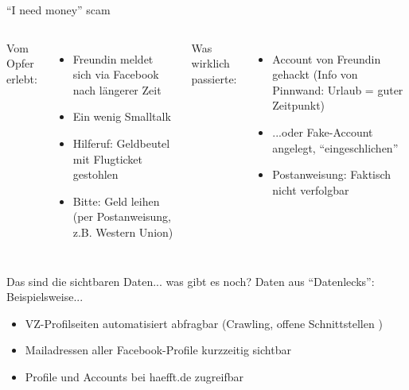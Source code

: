 \begin{frame}{"`I need money"' scam}
	\begin{columns}[t]
		Vom Opfer erlebt:
		\begin{itemize}
			\item Freundin meldet sich via Facebook nach längerer Zeit
			\item Ein wenig Smalltalk
			\item<2-> Hilferuf: Geldbeutel mit Flugticket gestohlen
			\item<2-> Bitte: Geld leihen (per Postanweisung, z.B. Western Union)
		\end{itemize}
		Was wirklich passierte:
		\begin{itemize}
			\item<3-> Account von Freundin gehackt (Info von Pinnwand: Urlaub = guter Zeitpunkt)
			\item<3-> ...oder Fake-Account angelegt, "`eingeschlichen"'
			\item<3-> Postanweisung: Faktisch nicht verfolgbar
		\end{itemize}
	\end{columns}
\end{frame}

\begin{frame}{Das sind die sichtbaren Daten... was gibt es noch?}
	Daten aus "`Datenlecks"': Beispielsweise...
	\begin{itemize}
		\item VZ-Profilseiten automatisiert abfragbar (Crawling, offene Schnittstellen%
		)
		\item Mailadressen aller Facebook-Profile kurzzeitig sichtbar%
		\item Profile und Accounts bei haefft.de zugreifbar%
	\end{itemize}

\end{frame}

